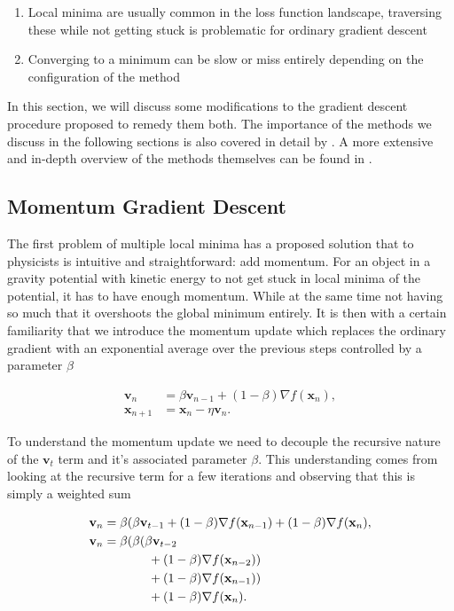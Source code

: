 \begin{enumerate}[start=0, label={(\bfseries C\arabic*):}]
\item Local minima are usually common in the loss function landscape, traversing these while not getting stuck is problematic for ordinary gradient descent
\item Converging to a minimum  can be slow or miss entirely depending on the configuration of the method 
\end{enumerate}

\noindent In this section, we will discuss some modifications to the gradient descent procedure proposed to remedy them both.  The importance of the methods we discuss in the following sections is also covered in detail by \citet{Sutskever2013}. A more extensive and in-depth overview of the methods themselves can be found in \citet{Ruder}.

\subsection{Momentum Gradient Descent}\label{sec:momentum_gd}

The first problem of multiple local minima has a proposed solution that to physicists is intuitive and straightforward: add momentum. For an object in a gravity potential with kinetic energy to not get stuck in local minima of the potential, it has to have enough momentum. While at the same time not having so much that it overshoots the global minimum entirely. It is then with a certain familiarity that we introduce the momentum update which replaces the ordinary gradient with an exponential average over the previous steps controlled by a parameter $\beta$

\begin{equation}\label{eq:momentum}
\begin{split}
\mathbf{v}_n &= \beta \mathbf{v}_{n-1} + (1 - \beta) \nabla f(\mathbf{x}_{n}),\\
\mathbf{x}_{n+1} &= \mathbf{x}_n - \eta\mathbf{v}_n .
\end{split}
\end{equation}


\noindent To understand the momentum update we need to decouple the recursive nature of the $\mathbf{v}_t$ term and it's associated parameter $\beta$. This understanding comes from looking at the recursive term for a few iterations and observing that this is simply a weighted sum 

\begin{align*}
\mathbf{v}_n &= \beta(\beta \mathbf{v}_{t-1} + (1-\beta)\nabla f(\mathbf{x}_{n-1})+ (1-\beta)\nabla f(\mathbf{x}_{n}), \\
\mathbf{v}_n &= \beta(\beta (\beta \mathbf{v}_{t-2} \\& \hspace{0.5in}+ (1-\beta)\nabla f(\mathbf{x}_{n-2})) \\
& \hspace{0.5in}+ (1-\beta)\nabla f(\mathbf{x}_{n-1})) \\
& \hspace{0.5in}+ (1-\beta)\nabla f(\mathbf{x}_{n}).
\end{align*}

